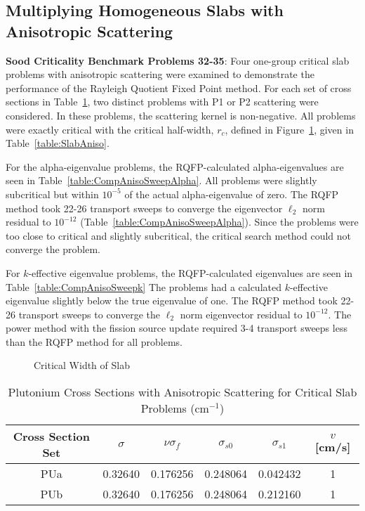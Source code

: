 \subsection{Multiplying Homogeneous Slabs with Anisotropic Scattering}

\textbf{Sood Criticality Benchmark Problems 32-35}: Four one-group critical slab problems with anisotropic scattering were examined to demonstrate the performance of the Rayleigh Quotient Fixed Point method. For each set of cross sections in Table~\ref{table:SoodPUAniso}, two distinct problems with P1 or P2 scattering were considered. In these problems, the scattering kernel is non-negative. All problems were exactly critical with the critical half-width, $r_{c}$, defined in Figure~\ref{fig:SlabCritWidth}, given in Table~\ref{table:SlabAniso}.

For the alpha-eigenvalue problems, the RQFP-calculated alpha-eigenvalues are seen in Table~\ref{table:CompAnisoSweepAlpha}. All problems were slightly subcritical but within $10^{-5}$ of the actual alpha-eigenvalue of zero. The RQFP method took 22-26 transport sweeps to converge the eigenvector $\ell_{2}$ norm residual to $10^{-12}$ (Table~\ref{table:CompAnisoSweepAlpha}). Since the problems were too close to critical and slightly subcritical, the critical search method could not converge the problem.

For $k$-effective eigenvalue problems, the RQFP-calculated eigenvalues are seen in Table~\ref{table:CompAnisoSweepk} The problems had a calculated $k$-effective eigenvalue slightly below the true eigenvalue of one. The RQFP method took 22-26 transport sweeps to converge the $\ell_{2}$ norm eigenvector residual to $10^{-12}$. The power method with the fission source update required 3-4 transport sweeps less than the RQFP method for all problems.

\begin{figure}[!htbp]
	\centering
	
	\caption{Critical Width of Slab}
	\label{fig:SlabCritWidth}
\end{figure}

\begin{table}[!htbp]
	\caption{Plutonium Cross Sections with Anisotropic Scattering for Critical Slab Problems (cm$^{-1}$) \cite{sood2003analytical}}
	\label{table:SoodPUAniso}
	\centering{}
    \begin{tabular}{*6c}
        \toprule
	Cross Section Set & $\sigma$ & $\nu \sigma_{f}$ & $\sigma_{s0}$  & $\sigma_{s1}$ & $v$ [cm/s] \\ 
        \midrule
	PUa & 0.32640 & 0.176256 & 0.248064 & 0.042432 & 1 \\
	PUb & 0.32640 & 0.176256 & 0.248064 & 0.212160 & 1 \\
        \bottomrule
    \end{tabular}
\end{table}

